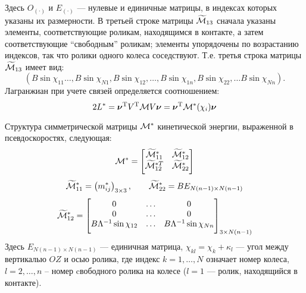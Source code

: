 Здесь $O_{(\boldsymbol{\cdot})}$ и $E_{(\boldsymbol{\cdot})}$ --- нулевые и единичные матрицы, в индексах которых указаны их размерности. В третьей строке матрицы $\widetilde{\mathcal{M}}_{13}$ сначала указаны элементы, соответствующие роликам, находящимся в контакте, а затем соответствующие ``свободным'' роликам; элементы упорядочены по возрастанию индексов, так что ролики одного колеса соседствуют. Т.е. третья строка матрицы $\widetilde{\mathcal{M}}_{13}$ имеет вид:
$$
    \left( B\sin\chi_{11} \ldots, B\sin\chi_{N1}, B\sin\chi_{12}, \ldots, B\sin\chi_{1n}, B\sin\chi_{22}, \ldots B\sin\chi_{Nn} \right).
$$
Лагранжиан при учете связей определяется соотношением:
$$ 2L^{*}  = \boldsymbol{\mathbf{\nu}}^\mathrm{T} V^\mathrm{T}\mathcal{M} V\boldsymbol{\mathbf{\nu}} = \boldsymbol{\mathbf{\nu}}^\mathrm{T} \mathcal{M}^*(\chi_i)\boldsymbol{\mathbf{\nu}} $$

Структура симметрической матрицы $\mathcal{M}^*$ кинетической энергии, выраженной в псевдоскоростях, следующая:
$$
\M^* = 
    \begin{bmatrix}
        \widetilde{\M}^*_{11} & \widetilde{\M}^*_{12} \\
        \widetilde{\M}^{*T}_{12} & \widetilde{\M}^*_{22} \\[4pt]
    \end{bmatrix}
\vsp
$$
$$
\widetilde{\M}^*_{11} = 
    \left(
        m^*_{ij}
    \right)_{3\times3},
\qquad
\widetilde{\M}^*_{22} = 
    BE_{N(n-1) \times N(n-1)}
\vsp
$$
$$
\widetilde{\M}^*_{12} = 
    \begin{bmatrix}
        0&\ldots& 0 \\
        0&\ldots&0 \\
        B\Lambda^{-1}\sin\chi_{12}&\ldots& B\Lambda^{-1}\sin\chi_{Nn}\\[4pt]
    \end{bmatrix}_{3\times N(n-1)}
\vsp
$$
Здесь $E_{N(n-1) \times N(n-1)}$ --- единичная матрица, $\chi_{kl} = \chi_k+\kappa_l$ --- угол между вертикалью $OZ$ и осью ролика, где индекс $k = 1,\dots,N$ означает номер колеса, $l = 2,\ldots, n$ -- номер cвободного ролика на колесе ($l = 1$ --- ролик, находящийся в контакте).

